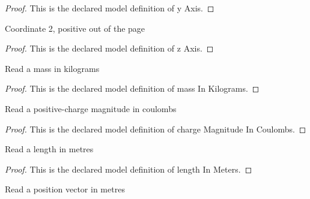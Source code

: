 \begin{proof}
  This is the declared model definition of y Axis.
\end{proof}
\begin{definition}[z Axis]
  \label{def:physics:phyx-mini-0958:phyxminiproblems-problemphyxmini0958-zaxis}
  Coordinate 2, positive out of the page
\end{definition}
\begin{proof}
  This is the declared model definition of z Axis.
\end{proof}
\begin{definition}
  \label{def:physics:phyx-mini-0958:phyxminiproblems-problemphyxmini0958-massinkilograms}
  Read a mass in kilograms
\end{definition}
\begin{proof}
  This is the declared model definition of mass In Kilograms.
\end{proof}
\begin{definition}
  \label{def:physics:phyx-mini-0958:phyxminiproblems-problemphyxmini0958-chargemagnitudeincoulombs}
  Read a positive-charge magnitude in coulombs
\end{definition}
\begin{proof}
  This is the declared model definition of charge Magnitude In Coulombs.
\end{proof}
\begin{definition}
  \label{def:physics:phyx-mini-0958:phyxminiproblems-problemphyxmini0958-lengthinmeters}
  Read a length in metres
\end{definition}
\begin{proof}
  This is the declared model definition of length In Meters.
\end{proof}
\begin{definition}
  \label{def:physics:phyx-mini-0958:phyxminiproblems-problemphyxmini0958-positionvectorinmeters}
  Read a position vector in metres
\end{definition}
